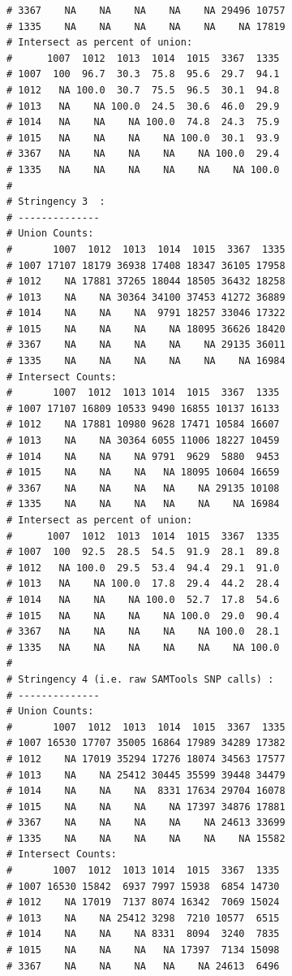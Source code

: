 \documentclass{article}\usepackage[]{graphicx}\usepackage[]{color}
\makeatletter
\newenvironment{kframe}{%
 \def\at@end@of@kframe{}%
 \ifinner\ifhmode%
  \def\at@end@of@kframe{\end{minipage}}%
  \begin{minipage}{\columnwidth}%
 \fi\fi%
 \def\FrameCommand##1{\hskip\@totalleftmargin \hskip-\fboxsep
 \colorbox{shadecolor}{##1}\hskip-\fboxsep
     \hskip-\linewidth \hskip-\@totalleftmargin \hskip\columnwidth}%
 \MakeFramed {\advance\hsize-\width
   \@totalleftmargin\z@ \linewidth\hsize
   \@setminipage}}%
 {\par\unskip\endMakeFramed%
 \at@end@of@kframe}
\newenvironment{knitrout}{}{} %
\makeatother
\begin{document}
\begin{knitrout}
\begin{kframe}
\begin{verbatim}
# 3367    NA    NA    NA    NA    NA 29496 10757
# 1335    NA    NA    NA    NA    NA    NA 17819
# Intersect as percent of union:
#      1007  1012  1013  1014  1015  3367  1335
# 1007  100  96.7  30.3  75.8  95.6  29.7  94.1
# 1012   NA 100.0  30.7  75.5  96.5  30.1  94.8
# 1013   NA    NA 100.0  24.5  30.6  46.0  29.9
# 1014   NA    NA    NA 100.0  74.8  24.3  75.9
# 1015   NA    NA    NA    NA 100.0  30.1  93.9
# 3367   NA    NA    NA    NA    NA 100.0  29.4
# 1335   NA    NA    NA    NA    NA    NA 100.0
# 
# Stringency 3  :
# --------------
# Union Counts:
#       1007  1012  1013  1014  1015  3367  1335
# 1007 17107 18179 36938 17408 18347 36105 17958
# 1012    NA 17881 37265 18044 18505 36432 18258
# 1013    NA    NA 30364 34100 37453 41272 36889
# 1014    NA    NA    NA  9791 18257 33046 17322
# 1015    NA    NA    NA    NA 18095 36626 18420
# 3367    NA    NA    NA    NA    NA 29135 36011
# 1335    NA    NA    NA    NA    NA    NA 16984
# Intersect Counts:
#       1007  1012  1013 1014  1015  3367  1335
# 1007 17107 16809 10533 9490 16855 10137 16133
# 1012    NA 17881 10980 9628 17471 10584 16607
# 1013    NA    NA 30364 6055 11006 18227 10459
# 1014    NA    NA    NA 9791  9629  5880  9453
# 1015    NA    NA    NA   NA 18095 10604 16659
# 3367    NA    NA    NA   NA    NA 29135 10108
# 1335    NA    NA    NA   NA    NA    NA 16984
# Intersect as percent of union:
#      1007  1012  1013  1014  1015  3367  1335
# 1007  100  92.5  28.5  54.5  91.9  28.1  89.8
# 1012   NA 100.0  29.5  53.4  94.4  29.1  91.0
# 1013   NA    NA 100.0  17.8  29.4  44.2  28.4
# 1014   NA    NA    NA 100.0  52.7  17.8  54.6
# 1015   NA    NA    NA    NA 100.0  29.0  90.4
# 3367   NA    NA    NA    NA    NA 100.0  28.1
# 1335   NA    NA    NA    NA    NA    NA 100.0
# 
# Stringency 4 (i.e. raw SAMTools SNP calls) :
# --------------
# Union Counts:
#       1007  1012  1013  1014  1015  3367  1335
# 1007 16530 17707 35005 16864 17989 34289 17382
# 1012    NA 17019 35294 17276 18074 34563 17577
# 1013    NA    NA 25412 30445 35599 39448 34479
# 1014    NA    NA    NA  8331 17634 29704 16078
# 1015    NA    NA    NA    NA 17397 34876 17881
# 3367    NA    NA    NA    NA    NA 24613 33699
# 1335    NA    NA    NA    NA    NA    NA 15582
# Intersect Counts:
#       1007  1012  1013 1014  1015  3367  1335
# 1007 16530 15842  6937 7997 15938  6854 14730
# 1012    NA 17019  7137 8074 16342  7069 15024
# 1013    NA    NA 25412 3298  7210 10577  6515
# 1014    NA    NA    NA 8331  8094  3240  7835
# 1015    NA    NA    NA   NA 17397  7134 15098
# 3367    NA    NA    NA   NA    NA 24613  6496

\end{verbatim}
\end{kframe}
\end{knitrout}
\end{document}
